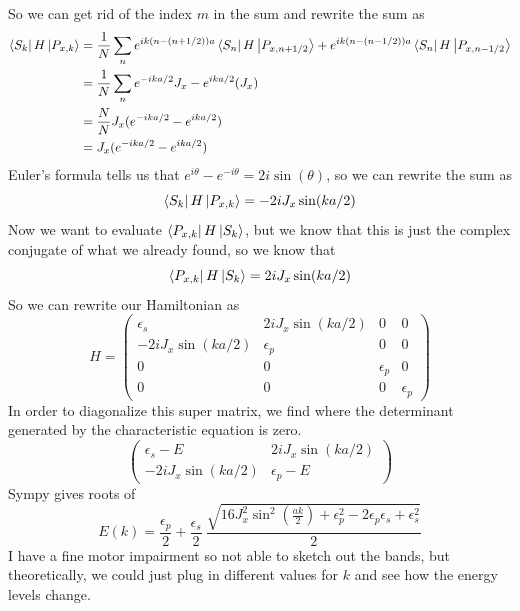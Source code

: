 \documentclass{article}
\begin{document}
So we can get rid of the index $m$ in the sum and rewrite the sum as
\begin{align}
    \bra{S_k}H\ket{P_{x,k}} &= \frac{1}{N}\sum_{n}e^{ik(n-(n+1/2))a}\bra{S_n}H\ket{P_{x,n+1/2}} + e^{ik(n-(n-1/2))a}\bra{S_n}H\ket{P_{x,n-1/2}} \\
    &= \frac{1}{N}\sum_{n}e^{-ika/2}J_x - e^{ika/2}(J_x)\\
    &= \frac{N}{N}J_x(e^{-ika/2}-e^{ika/2})\\
    &= J_x(e^{-ika/2}-e^{ika/2})\\
\end{align}
Euler's formula tells us that $e^{i\theta}-e^{-i\theta}=2i\sin(\theta)$, so we can rewrite the sum as
\begin{equation}
    \bra{S_k}H\ket{P_{x,k}} = -2iJ_x\sin(ka/2)
\end{equation}
Now we want to evaluate $\bra{P_{x,k}}H\ket{S_k}$, but we know that this is just the complex conjugate of what we already found, so we know that
\begin{equation}
    \bra{P_{x,k}}H\ket{S_k} = 2iJ_x\sin(ka/2)
\end{equation}
So we can rewrite our Hamiltonian as
\begin{equation}
    H = \begin{pmatrix}
    \epsilon_s & 2iJ_x\sin(ka/2) & 0 & 0\\
    -2iJ_x\sin(ka/2) & \epsilon_p & 0 & 0\\
    0 & 0 & \epsilon_p & 0\\
    0 & 0 & 0 & \epsilon_p 
    \end{pmatrix}
\end{equation}
In order to diagonalize this super matrix, we find where the determinant generated by the characteristic equation is zero.
\begin{equation}
    \begin{pmatrix}
    \epsilon_s-E & 2iJ_x\sin(ka/2)\\
    -2iJ_x\sin(ka/2) & \epsilon_p-E
    \end{pmatrix}
\end{equation}
Sympy gives roots of
\begin{equation}
    E(k) = \frac{\epsilon_{p}}{2} + \frac{\epsilon_{s}}{2} \ \frac{\sqrt{16 J_{x}^{2} \sin^{2}{\left(\frac{a k}{2} \right)} + \epsilon_{p}^{2} - 2 \epsilon_{p} \epsilon_{s} + \epsilon_{s}^{2}}}{2}
\end{equation}
I have a fine motor impairment so not able to sketch out the bands, but theoretically, we could just plug in different values for $k$ and see how the energy levels change.\\
\end{document}
